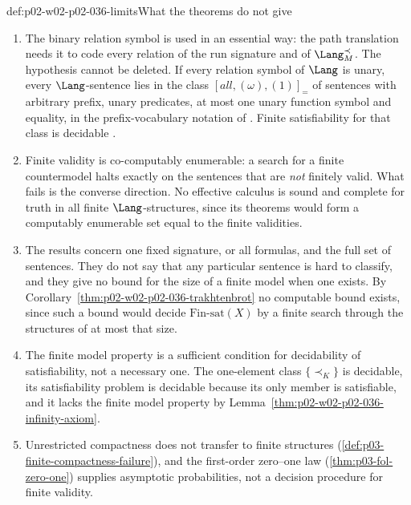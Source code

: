 \begin{hbwarning}{def:p02-w02-p02-036-limits}{What the theorems do not give}
\begin{enumerate}
\item The binary relation symbol is used in an essential way: the path
  translation needs it to code every relation of the run signature and of
  \(\Lang_M^{\prec}\).  The hypothesis cannot be deleted.  If every relation
  symbol of \(\Lang\) is unary, every \(\Lang\)-sentence lies in the class
  \([\mathit{all},(\omega),(1)]_{=}\) of sentences with arbitrary prefix,
  unary predicates, at most one unary function symbol and equality, in the
  prefix-vocabulary notation of
  \cite[Sect.~1.3, pp.~8--9]{BorgerGradelGurevich1997}.  Finite
  satisfiability for that class is decidable
  \cite[Thm.~6.0.2(6), p.~240]{BorgerGradelGurevich1997}.
\item Finite validity is co-computably enumerable: a search for a finite
  countermodel halts exactly on the sentences that are \emph{not} finitely
  valid.  What fails is the converse direction.  No effective calculus is
  sound and complete for truth in all finite \(\Lang\)-structures, since its
  theorems would form a computably enumerable set equal to the finite
  validities.
\item The results concern one fixed signature, or all formulas, and the full
  set of sentences.  They do not say that any particular sentence is hard to
  classify, and they give no bound for the size of a finite model when one
  exists.  By Corollary~\ref{thm:p02-w02-p02-036-trakhtenbrot} no computable
  bound exists, since such a bound would decide \(\mathrm{Fin\text{-}sat}(X)\)
  by a finite search through the structures of at most that size.
\item The finite model property is a sufficient condition for decidability
  of satisfiability, not a necessary one.  The one-element class
  \(\{\prec_K\}\) is decidable, its satisfiability problem is decidable
  because its only member is satisfiable, and it lacks the finite
  model property by Lemma~\ref{thm:p02-w02-p02-036-infinity-axiom}.
\item Unrestricted compactness does not transfer to finite structures
  (\cref{def:p03-finite-compactness-failure}), and the first-order zero--one
  law (\cref{thm:p03-fol-zero-one}) supplies asymptotic probabilities, not a
  decision procedure for finite validity.
\end{enumerate}
\end{hbwarning}

